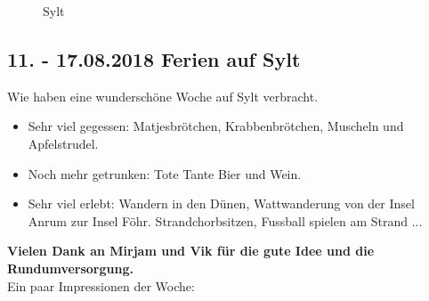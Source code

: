 \begin{figure}[b]
   \centering
   \quad
   \quad
   \quad
   \caption[Sylt]{Sylt}
\end{figure}

\subsection{11. - 17.08.2018 Ferien auf Sylt}
Wie haben eine wunderschöne Woche auf Sylt verbracht.

\begin{itemize}
\item Sehr viel gegessen: Matjesbrötchen, Krabbenbrötchen, Muscheln und Apfelstrudel.
\item Noch mehr getrunken: Tote Tante Bier und Wein.
\item Sehr viel erlebt: Wandern in den Dünen, Wattwanderung von der Insel Anrum zur Insel Föhr. Strandchorbsitzen, Fussball spielen am Strand ... 
\end{itemize} 
\textbf{Vielen Dank an Mirjam und Vik für die gute Idee und die Rundumversorgung.}\\
Ein paar Impressionen der Woche:


